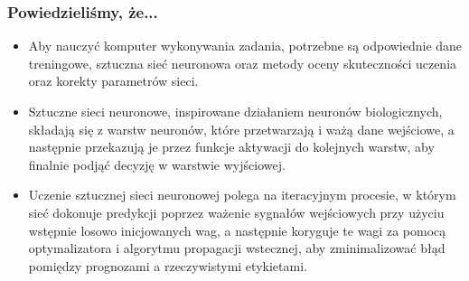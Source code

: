 \documentclass{beamer}
\begin{document}
\begin{frame}[fragile]
\frametitle{Powiedzieliśmy, że...}
\begin{itemize}
\item Aby nauczyć komputer wykonywania zadania, potrzebne są odpowiednie dane treningowe, sztuczna sieć neuronowa oraz metody oceny skuteczności uczenia oraz korekty parametrów sieci.
\item Sztuczne sieci neuronowe, inspirowane działaniem neuronów biologicznych, składają się z warstw neuronów, które przetwarzają i ważą dane wejściowe, a następnie przekazują je przez funkcje aktywacji do kolejnych warstw, aby finalnie podjąć decyzję w warstwie wyjściowej. 
\item Uczenie sztucznej sieci neuronowej polega na iteracyjnym procesie, w którym sieć dokonuje predykcji poprzez ważenie sygnałów wejściowych przy użyciu wstępnie losowo inicjowanych wag, a następnie koryguje te wagi za pomocą optymalizatora i algorytmu propagacji wstecznej, aby zminimalizować błąd pomiędzy prognozami a rzeczywistymi etykietami. 
\end{itemize}
\end{frame}
\end{document}
